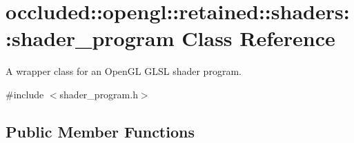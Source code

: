 \hypertarget{classoccluded_1_1opengl_1_1retained_1_1shaders_1_1shader__program}{\section{occluded\+:\+:opengl\+:\+:retained\+:\+:shaders\+:\+:shader\+\_\+program Class Reference}
\label{classoccluded_1_1opengl_1_1retained_1_1shaders_1_1shader__program}
}


A wrapper class for an Open\+G\+L G\+L\+S\+L shader program.  




{\ttfamily \#include $<$shader\+\_\+program.\+h$>$}

\subsection*{Public Member Functions}
